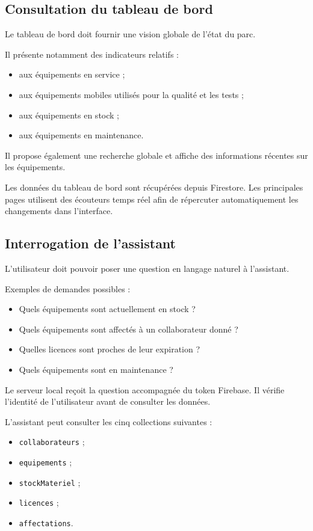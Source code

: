 \documentclass{rapportENSIAS}
\begin{document}
\subsection{Consultation du tableau de bord}

Le tableau de bord doit fournir une vision globale de l’état du parc.

Il présente notamment des indicateurs relatifs :

\begin{itemize}
\item aux équipements en service ;
\item aux équipements mobiles utilisés pour la qualité et les tests ;
\item aux équipements en stock ;
\item aux équipements en maintenance.
\end{itemize}

Il propose également une recherche globale et affiche des informations récentes sur les équipements.

Les données du tableau de bord sont récupérées depuis Firestore. Les principales pages utilisent des écouteurs temps réel afin de répercuter automatiquement les changements dans l’interface.

\subsection{Interrogation de l’assistant}

L’utilisateur doit pouvoir poser une question en langage naturel à l’assistant.

Exemples de demandes possibles :

\begin{itemize}
\item Quels équipements sont actuellement en stock ?
\item Quels équipements sont affectés à un collaborateur donné ?
\item Quelles licences sont proches de leur expiration ?
\item Quels équipements sont en maintenance ?
\end{itemize}

Le serveur local reçoit la question accompagnée du token Firebase. Il vérifie l’identité de l’utilisateur avant de consulter les données.

L’assistant peut consulter les cinq collections suivantes :

\begin{itemize}
\item \texttt{collaborateurs} ;
\item \texttt{equipements} ;
\item \texttt{stockMateriel} ;
\item \texttt{licences} ;
\item \texttt{affectations}.
\end{itemize}
\end{document}
